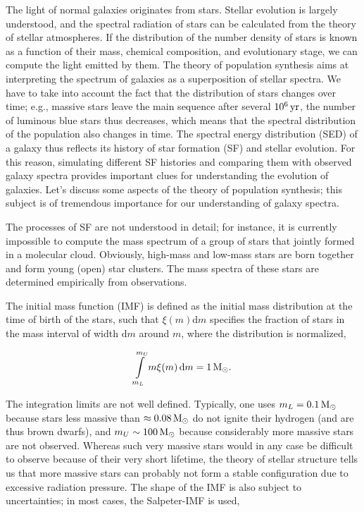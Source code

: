 \documentclass[a4paper,11pt]{article}
\begin{document}
{\noindent}The light of normal galaxies originates from stars. Stellar evolution is largely understood, and the spectral radiation of stars can be calculated from the theory of stellar atmospheres. If the distribution of the number density of stars is known as a function of their mass, chemical composition, and evolutionary stage, we can compute the light emitted by them. The theory of population synthesis aims at interpreting the spectrum of galaxies as a superposition of stellar spectra. We have to take into account the fact that the distribution of stars changes over time; e.g., massive stars leave the main sequence after several $10^6\,{\rm yr}$, the number of luminous blue stars thus decreases, which means that the spectral distribution of the population also changes in time. The spectral energy distribution (SED) of a galaxy thus reflects its history of star formation (SF) and stellar evolution. For this reason, simulating different SF histories and comparing them with observed galaxy spectra provides important clues for understanding the evolution of galaxies. Let's discuss some aspects of the theory of population synthesis; this subject is of tremendous importance for our understanding of galaxy spectra.

{\noindent}The processes of SF are not understood in detail; for instance, it is currently impossible to compute the mass spectrum of a group of stars that jointly formed in a molecular cloud. Obviously, high-mass and low-mass stars are born together and form young (open) star clusters. The mass spectra of these stars are determined empirically from observations.

{\noindent}The initial mass function (IMF) is defined as the initial mass distribution at the time of birth of the stars, such that $\xi(m)\mathrm{d}m$ specifies the fraction of stars in the mass interval of width $\mathrm{d}m$ around $m$, where the distribution is normalized,

\begin{align*}
    \int\limits_{m_L}^{m_U} m\xi(m)\,\mathrm{d}m = 1\,{\rm M}_\odot.
\end{align*}

{\noindent}The integration limits are not well defined. Typically, one uses $m_L=0.1\,{\rm M_\odot}$ because stars less massive than $\approx0.08\,{\rm M_\odot}$ do not ignite their hydrogen (and are thus brown dwarfs), and $m_U\sim100\,{\rm M_\odot}$ because considerably more massive stars are not observed. Whereas such very massive stars would in any case be difficult to observe because of their very short lifetime, the theory of stellar structure tells us that more massive stars can probably not form a stable configuration due to excessive radiation pressure. The shape of the IMF is also subject to uncertainties; in most cases, the Salpeter-IMF is used,
\end{document}
